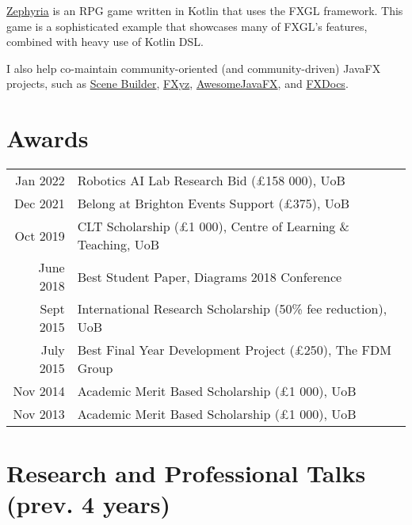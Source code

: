 \documentclass[a4paper,11pt]{article} %
\begin{document}
\href{https://github.com/AlmasB/Zephyria}{Zephyria} is an RPG game written in Kotlin that uses the FXGL framework. This game is a sophisticated example that showcases many of FXGL's features, combined with heavy use of Kotlin DSL.

I also help co-maintain community-oriented (and community-driven) JavaFX projects, such as \href{https://github.com/gluonhq/scenebuilder}{Scene Builder}, \href{https://github.com/FXyz/FXyz}{FXyz}, \href{https://github.com/mhrimaz/AwesomeJavaFX}{AwesomeJavaFX}, and \href{https://github.com/FXDocs/docs}{FXDocs}.




\section{Awards}

\begin{tabular}{rl}

Jan 2022 & Robotics AI Lab Research Bid (£158 000), UoB\\

Dec 2021 & Belong at Brighton Events Support (£375), UoB\\

Oct 2019 & CLT Scholarship (£1 000), Centre of Learning \& Teaching, UoB\\

June 2018 & Best Student Paper, Diagrams 2018 Conference\\

Sept 2015 & International Research Scholarship (50\% fee reduction), UoB\\

July 2015 & Best Final Year Development Project (£250), The FDM Group\\

Nov 2014 & Academic Merit Based Scholarship (£1 000), UoB \\

Nov 2013 & Academic Merit Based Scholarship (£1 000), UoB \\

\end{tabular}


\section{Research and Professional Talks (prev. 4 years)}
\end{document}
